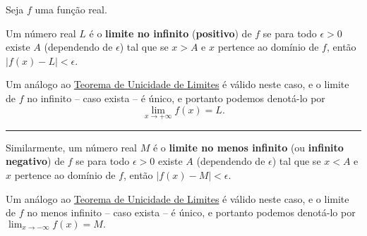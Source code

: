 \begin{definition}
	Seja $f$ uma função real.

	Um número real $L$ é o \textbf{limite no infinito} (\textbf{positivo}) de $f$ se para todo $\epsilon>0$ existe $A$ (dependendo de $\epsilon$) tal que se $x>A$ e $x$ pertence ao domínio de $f$, então $|f(x)-L|<\epsilon$.

	Um análogo ao \href{01.limites\teo_unicidade_de_limite_moodle.html}{Teorema de Unicidade de Limites} é válido neste caso, e o limite de $f$ no infinito -- caso exista -- é único, e portanto podemos denotá-lo por
	\[\lim_{x\to+\infty}f(x)=L.\]
	
	\hrule
	
	Similarmente, um número real $M$ é o \textbf{limite no menos infinito} (ou \textbf{infinito negativo}) de $f$ se para todo $\epsilon>0$ existe $A$ (dependendo de $\epsilon$) tal que se $x<A$ e $x$ pertence ao domínio de $f$, então $|f(x)-M|<\epsilon$.

	Um análogo ao \href{01.limites\teo_unicidade_de_limite_moodle.html}{Teorema de Unicidade de Limites} é válido neste caso, e o limite de $f$ no menos infinito -- caso exista -- é único, e portanto podemos denotá-lo por
	$\lim_{x\to-\infty}f(x)=M.$
\end{definition}